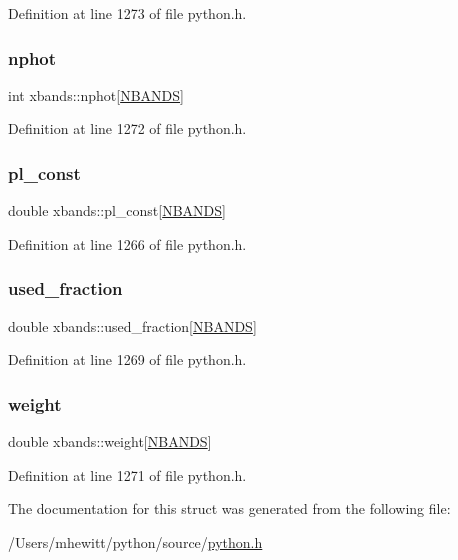 Definition at line 1273 of file python.\+h.

\mbox{\label{structxbands_acc3e184739961350ec8f40f7ecd5908a}} 
\subsubsection{\texorpdfstring{nphot}{nphot}}
{\footnotesize\ttfamily int xbands\+::nphot\mbox{[}\hyperlink{python_8h_a46ee023ac3f5d103e533843238d2e52a}{N\+B\+A\+N\+DS}\mbox{]}}



Definition at line 1272 of file python.\+h.

\mbox{\label{structxbands_a162fb1999189dffd52bcd6d090792481}} 
\subsubsection{\texorpdfstring{pl\+\_\+const}{pl\_const}}
{\footnotesize\ttfamily double xbands\+::pl\+\_\+const\mbox{[}\hyperlink{python_8h_a46ee023ac3f5d103e533843238d2e52a}{N\+B\+A\+N\+DS}\mbox{]}}



Definition at line 1266 of file python.\+h.

\mbox{\label{structxbands_a0f946786fa05575c9da9d60699c45202}} 
\subsubsection{\texorpdfstring{used\+\_\+fraction}{used\_fraction}}
{\footnotesize\ttfamily double xbands\+::used\+\_\+fraction\mbox{[}\hyperlink{python_8h_a46ee023ac3f5d103e533843238d2e52a}{N\+B\+A\+N\+DS}\mbox{]}}



Definition at line 1269 of file python.\+h.

\mbox{\label{structxbands_abab6361efd17b70504fb67164711687a}} 
\subsubsection{\texorpdfstring{weight}{weight}}
{\footnotesize\ttfamily double xbands\+::weight\mbox{[}\hyperlink{python_8h_a46ee023ac3f5d103e533843238d2e52a}{N\+B\+A\+N\+DS}\mbox{]}}



Definition at line 1271 of file python.\+h.



The documentation for this struct was generated from the following file\+:\begin{DoxyCompactItemize}
\item 
/\+Users/mhewitt/python/source/\hyperlink{python_8h}{python.\+h}\end{DoxyCompactItemize}

